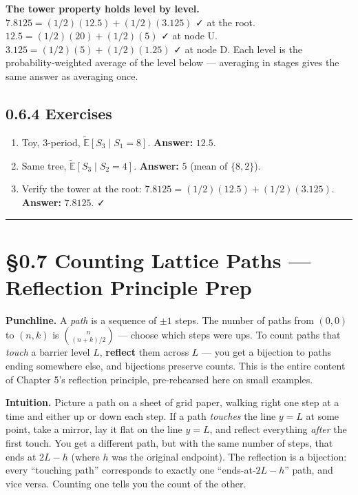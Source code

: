 \documentclass[
  10pt,
  twoside]{book}
\providecommand{\tightlist}{%
  \setlength{\itemsep}{0pt}\setlength{\parskip}{0pt}}
\begin{document}
\textbf{The tower property holds level by level.}
\(7.8125 = (1/2)(12.5) + (1/2)(3.125)\) ✓ at the root.
\(12.5 = (1/2)(20) + (1/2)(5)\) ✓ at node U.
\(3.125 = (1/2)(5) + (1/2)(1.25)\) ✓ at node D. Each level is the
probability-weighted average of the level below --- averaging in stages
gives the same answer as averaging once.

\subsection{0.6.4 Exercises}\label{exercises-5}

\begin{enumerate}
\def\labelenumi{\arabic{enumi}.}
\tightlist
\item
  Toy, 3-period, \(\tilde{\mathbb{E}}[S_3 \mid S_1 = 8]\).
  \textbf{Answer:} \(12.5\).
\item
  Same tree, \(\tilde{\mathbb{E}}[S_3 \mid S_2 = 4]\). \textbf{Answer:}
  \(5\) (mean of \(\{8, 2\}\)).
\item
  Verify the tower at the root: \(7.8125 = (1/2)(12.5) + (1/2)(3.125)\).
  \textbf{Answer:} \(7.8125\). ✓
\end{enumerate}

\begin{center}\rule{0.5\linewidth}{0.5pt}\end{center}

\section{§0.7 Counting Lattice Paths --- Reflection Principle
Prep}\label{counting-lattice-paths-reflection-principle-prep}

\textbf{Punchline.} A \emph{path} is a sequence of \(\pm 1\) steps. The
number of paths from \((0,0)\) to \((n, k)\) is \(\binom{n}{(n+k)/2}\)
--- choose which steps were ups. To count paths that \emph{touch} a
barrier level \(L\), \textbf{reflect} them across \(L\) --- you get a
bijection to paths ending somewhere else, and bijections preserve
counts. This is the entire content of Chapter 5's reflection principle,
pre-rehearsed here on small examples.

\textbf{Intuition.} Picture a path on a sheet of grid paper, walking
right one step at a time and either up or down each step. If a path
\emph{touches} the line \(y = L\) at some point, take a mirror, lay it
flat on the line \(y = L\), and reflect everything \emph{after} the
first touch. You get a different path, but with the same number of
steps, that ends at \(2L - h\) (where \(h\) was the original endpoint).
The reflection is a bijection: every ``touching path'' corresponds to
exactly one ``ends-at-\(2L-h\)'' path, and vice versa. Counting one
tells you the count of the other.
\end{document}
